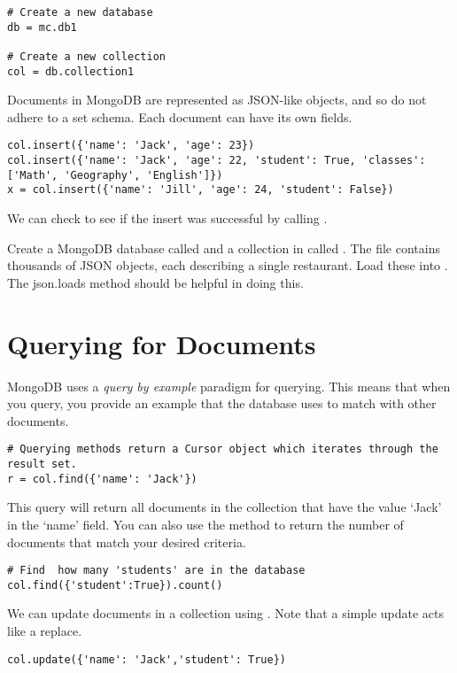\begin{lstlisting}
# Create a new database
db = mc.db1

# Create a new collection
col = db.collection1
\end{lstlisting}

Documents in MongoDB are represented as JSON-like objects, and so do not adhere to a set schema.
Each document can have its own fields.

\begin{lstlisting}
col.insert({'name': 'Jack', 'age': 23})
col.insert({'name': 'Jack', 'age': 22, 'student': True, 'classes': ['Math', 'Geography', 'English']})
x = col.insert({'name': 'Jill', 'age': 24, 'student': False})
\end{lstlisting}
We can check to see if the insert was successful by calling .


\begin{problem}
Create a MongoDB database called  and a collection in  called . The file  contains thousands of JSON objects, each describing a single restaurant. Load these into . The json.loads method should be helpful in doing this.
\end{problem}

\section*{Querying for Documents}
MongoDB uses a \emph{query by example} paradigm for querying.  This means that when you query, you provide an example that the database uses to match with other documents.
\begin{lstlisting}
# Querying methods return a Cursor object which iterates through the result set.
r = col.find({'name': 'Jack'})
\end{lstlisting}
This query will return all documents in the collection that have the value `Jack' in the `name' field.
You can also use the  method to return the number of documents that match your desired criteria.
\begin{lstlisting}
# Find  how many 'students' are in the database
col.find({'student':True}).count()
\end{lstlisting}

We can update documents in a collection using .  Note that a simple update acts like a replace.
\begin{lstlisting}
col.update({'name': 'Jack','student': True})
\end{lstlisting}

